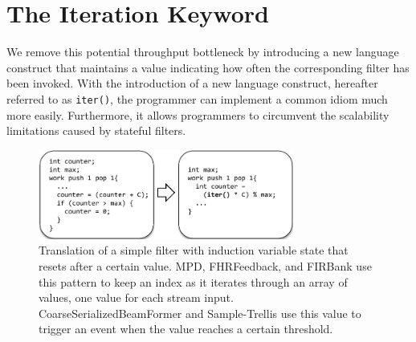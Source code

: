 %  
%
%
%
%
%
%    
%
%

\section{The Iteration Keyword}
\label{sec:iteration}
We remove this potential throughput bottleneck by 
introducing a new language construct that maintains a value 
indicating how often the corresponding filter has been invoked.  
With the introduction of a new language construct, hereafter referred to as {\tt iter()}, the programmer can implement a common idiom much more easily.  Furthermore, it allows programmers to circumvent the scalability limitations caused by stateful filters.


\begin{figure}[h]
\includegraphics[width=3.3in]{figures/transformation1.pdf}
\caption{Translation of a simple filter with induction variable state that resets after a certain value.  MPD, FHRFeedback, and FIRBank use this pattern to keep an index as it iterates through an array of values, one value for each stream input.  CoarseSerializedBeamFormer and Sample-Trellis use this value to trigger an event when the value reaches a certain threshold.
 \protect\label{fig:transform-after-simple}}
\vspace{-10pt}
\end{figure}

